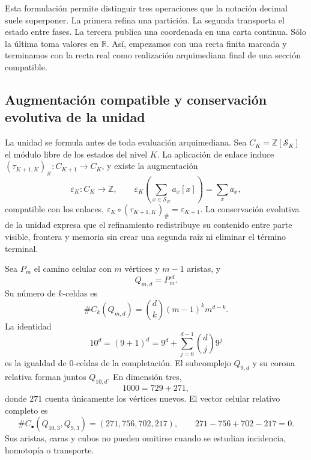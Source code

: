 Esta formulación permite distinguir tres operaciones que la notación decimal
suele superponer. La primera refina una partición. La segunda transporta el
estado entre fases. La tercera publica una coordenada en una carta continua.
Sólo la última toma valores en \(\mathbb R\). Así, empezamos con una recta
finita marcada y terminamos con la recta real como realización arquimediana
final de una sección compatible.

\subsection*{Augmentación compatible y conservación evolutiva de la unidad}

La unidad se formula antes de toda evaluación arquimediana. Sea
\(C_K=\mathbb Z[\mathcal S_K]\) el módulo libre de los estados del nivel
\(K\). La aplicación de enlace induce
\((\tau_{K+1,K})_\#:C_{K+1}\to C_K\), y existe la augmentación
\[
 \varepsilon_K:C_K\longrightarrow\mathbb Z,\qquad
 \varepsilon_K\!\left(\sum_{x\in\mathcal S_K}a_x[x]\right)=\sum_xa_x,
\]
compatible con los enlaces,
\(\varepsilon_K\circ(\tau_{K+1,K})_\#=\varepsilon_{K+1}\). La conservación evolutiva
de la unidad expresa que el refinamiento redistribuye su contenido entre
parte visible, frontera y memoria sin crear una segunda raíz ni eliminar el
término terminal.

Sea \(P_m\) el camino celular con \(m\) vértices y \(m-1\) aristas, y
\[
 Q_{m,d}=P_m^{\square d}.
\]
Su número de \(k\)-celdas es
\begin{equation}\label{p12-83-c0-s1:eq:horizonte-celdas-cubicas}
 \#C_k(Q_{m,d})=\binom dk(m-1)^k m^{d-k}.
\end{equation}
La identidad
\begin{equation}\label{p12-83-c0-s1:eq:horizonte-completacion-binomial}
 10^d=(9+1)^d
     =9^d+\sum_{j=0}^{d-1}\binom dj9^j
\end{equation}
es la igualdad de \(0\)-celdas de la completación. El subcomplejo
\(Q_{9,d}\) y su corona relativa forman juntos \(Q_{10,d}\). En dimensión
tres,
\[
 1000=729+271,
\]
donde \(271\) cuenta únicamente los vértices nuevos. El vector celular
relativo completo es
\begin{equation}\label{p12-83-c0-s1:eq:horizonte-corona-relativa}
 \#C_\bullet(Q_{10,3},Q_{9,3})=(271,756,702,217),
 \qquad 271-756+702-217=0.
\end{equation}
Sus aristas, caras y cubos no pueden omitirse cuando se estudian incidencia,
homotopía o transporte.

